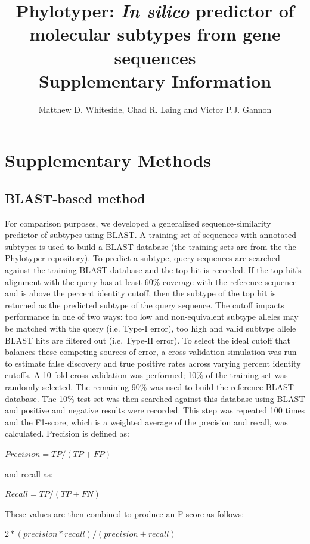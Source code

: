\documentclass[11pt,letterpaper]{article}
\title{Phylotyper: {\it In silico} predictor of molecular subtypes from gene sequences \\ \large Supplementary Information}
\author{Matthew D. Whiteside, Chad R. Laing and Victor P.J. Gannon}
\date{ }
\begin{document}
 
 
\tableofcontents

\clearpage

\section{Supplementary Methods}

\subsection{BLAST-based method}

For comparison purposes, we developed a generalized sequence-similarity predictor of subtypes using BLAST. A training set of sequences with annotated subtypes is used to build a BLAST database (the training sets are from the the Phylotyper repository). To predict a subtype, query sequences are searched against the training BLAST database and the top hit is recorded. If the top hit's alignment with the query has at least 60\% coverage with the reference sequence and is above the percent identity cutoff, then the subtype of the top hit is returned as the predicted subtype of the query sequence. The cutoff impacts performance in one of two ways: too low and non-equivalent subtype alleles may be matched with the query (i.e. Type-I error), too high and valid subtype allele BLAST hits are filtered out (i.e. Type-II error). To select the ideal cutoff that balances these competing sources of error, a cross-validation simulation was run to estimate false discovery and true positive rates across varying percent identity cutoffs. A 10-fold cross-validation was performed; 10\% of the training set was randomly selected. The remaining 90\% was used to build the reference BLAST database. The 10\% test set was then searched against this database using BLAST and positive and negative results were recorded. This step was repeated 100 times and the F1-score, which is a weighted average of the precision and recall, was calculated. Precision is defined as: 

$Precision = TP / (TP + FP)$

and recall as:

$Recall = TP / (TP + FN)$

These values are then combined to produce an F-score as follows:

$2 * ( precision * recall ) / ( precision + recall )$
\end{document}
